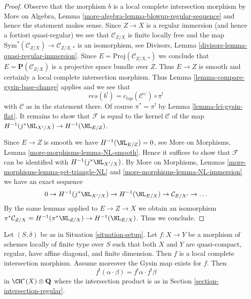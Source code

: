 \begin{proof}
Observe that the morphism $b$ is a local complete intersection morphism
by More on Algebra, Lemma \ref{more-algebra-lemma-blowup-regular-sequence}
and hence the statement makes sense. Since $Z \to X$ is a regular
immersion (and hence a fortiori quasi-regular) we see that $\mathcal{C}_{Z/X}$
is finite locally free and the map
$\text{Sym}^*(\mathcal{C}_{Z/X}) \to \mathcal{C}_{Z/X, *}$
is an isomorphism, see
Divisors, Lemma \ref{divisors-lemma-quasi-regular-immersion}.
Since $E = \text{Proj}(\mathcal{C}_{Z/X, *})$ we conclude
that $E = \mathbf{P}(\mathcal{C}_{Z/X})$
is a projective space bundle over $Z$.
Thus $E \to Z$ is smooth and certainly a local complete intersection
morphism. Thus Lemma \ref{lemma-compare-gysin-base-change}
applies and we see that
$$
res(b^!) = c_{top}(\mathcal{C}^\vee) \circ \pi^!
$$
with $\mathcal{C}$ as in the statement there.
Of course $\pi^* = \pi^!$ by Lemma \ref{lemma-lci-gysin-flat}.
It remains to show that $\mathcal{F}$ is equal to
the kernel $\mathcal{C}$ of the map
$H^{-1}(j^*\NL_{X'/X}) \to H^{-1}(\NL_{E/Z})$.

\medskip\noindent
Since $E \to Z$ is smooth we have $H^{-1}(\NL_{E/Z}) = 0$, see
More on Morphisms, Lemma \ref{more-morphisms-lemma-NL-smooth}.
Hence it suffices to show that $\mathcal{F}$ can be identified
with $H^{-1}(j^*\NL_{X'/X})$. By More on Morphisms, Lemmas
\ref{more-morphisms-lemma-get-triangle-NL} and
\ref{more-morphisms-lemma-NL-immersion} we have an exact sequence
$$
0 \to H^{-1}(j^*\NL_{X'/X}) \to H^{-1}(\NL_{E/X}) \to
\mathcal{C}_{E/X'} \to \ldots
$$
By the same lemmas applied to $E \to Z \to X$ we obtain an isomorphism
$\pi^*\mathcal{C}_{Z/X} = H^{-1}(\pi^*\NL_{Z/X}) \to H^{-1}(\NL_{E/X})$.
Thus we conclude.
\end{proof}

\begin{lemma}
\label{lemma-lci-gysin-product-regular}
Let $(S, \delta)$ be as in Situation \ref{situation-setup}.
Let $f : X \to Y$ be a morphism of schemes locally of finite
type over $S$ such that both $X$ and $Y$ are quasi-compact,
regular, have affine diagonal, and finite dimension.
Then $f$ is a local complete intersection morphism.
Assume moreover the Gysin map exists for $f$. Then
$$
f^!(\alpha \cdot \beta) = f^!\alpha \cdot f^!\beta
$$
in $\CH^*(X) \otimes \mathbf{Q}$ where the intersection product
is as in Section \ref{section-intersection-regular}.
\end{lemma}

